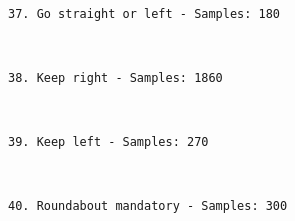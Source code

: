\documentclass[11pt]{article}
\begin{document}
    \begin{center}
    \end{center}
    { \hspace*{\fill} \\}
    
    \begin{Verbatim}[commandchars=\\\{\}]
37. Go straight or left - Samples: 180

    \end{Verbatim}

    \begin{center}
    \end{center}
    { \hspace*{\fill} \\}
    
    \begin{Verbatim}[commandchars=\\\{\}]
38. Keep right - Samples: 1860

    \end{Verbatim}

    \begin{center}
    \end{center}
    { \hspace*{\fill} \\}
    
    \begin{Verbatim}[commandchars=\\\{\}]
39. Keep left - Samples: 270

    \end{Verbatim}

    \begin{center}
    \end{center}
    { \hspace*{\fill} \\}
    
    \begin{Verbatim}[commandchars=\\\{\}]
40. Roundabout mandatory - Samples: 300

    \end{Verbatim}

    \begin{center}
    \end{center}
    { \hspace*{\fill} \\}
    
\end{document}
